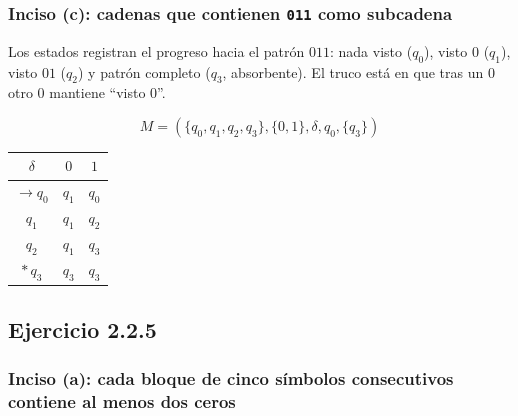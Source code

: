 \documentclass[12pt]{article}
\begin{document}
\subsubsection{Inciso (c): cadenas que contienen \texttt{011} como subcadena}

Los estados registran el progreso hacia el patrón $011$: nada visto ($q_0$), visto $0$ ($q_1$), visto $01$ ($q_2$) y patrón completo ($q_3$, absorbente). El truco está en que tras un $0$ otro $0$ mantiene ``visto $0$''.

\[
M=(\{q_0,q_1,q_2,q_3\},\{0,1\},\delta,q_0,\{q_3\})
\]

\begin{center}
\end{center}

\begin{center}
\begin{tabular}{c|cc}
$\delta$ & $0$ & $1$\\ \hline
$\rightarrow q_0$ & $q_1$ & $q_0$\\
$q_1$ & $q_1$ & $q_2$\\
$q_2$ & $q_1$ & $q_3$\\
$*\,q_3$ & $q_3$ & $q_3$\\
\end{tabular}
\end{center}


\subsection{Ejercicio 2.2.5}

\subsubsection{Inciso (a): cada bloque de cinco símbolos consecutivos contiene al menos dos ceros}
\end{document}
